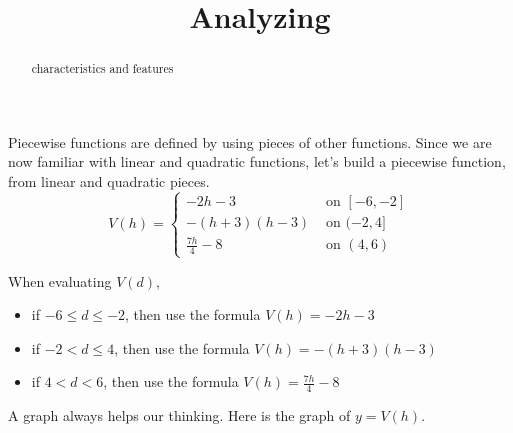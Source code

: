 \documentclass{ximera}
\title{Analyzing}
\begin{document}
\begin{abstract}
characteristics and features
\end{abstract}
\maketitle



Piecewise functions are defined by using pieces of other functions. Since we are now familiar with linear and quadratic functions, let's build a piecewise function, from linear and quadratic pieces. \\




\[
V(h) = 
\begin{cases}
  -2h-3 & \text{ on } [-6, -2]   \\
  -(h+3)(h-3) & \text{ on } (-2, 4]  \\
  \frac{7h}{4} - 8 & \text{ on } (4,6)
\end{cases}
\]




\begin{idea}

When evaluating $V(d)$, 

\begin{itemize}
  \item if $-6 \leq d \leq -2$, then use the formula $V(h) = -2h - 3$
  \item if $-2 < d \leq 4$, then use the formula $V(h) = -(h+3)(h-3)$
  \item if $4 < d < 6$, then use the formula $V(h) = \frac{7h}{4} - 8$
\end{itemize}

\end{idea}

A graph always helps our thinking. Here is the graph of $y = V(h)$.
\end{document}
